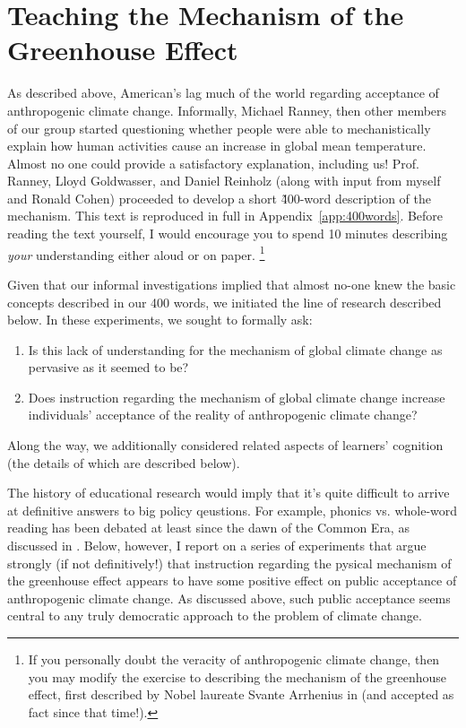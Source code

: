 \graphicspath{{mechanism/}}

\chapter{Teaching the Mechanism of the Greenhouse Effect}
\label{chap:mechanism}

As described above, American's lag much of the world regarding acceptance of
anthropogenic climate change. Informally, Michael Ranney, then other members of
our group started questioning whether people were able to mechanistically
explain how human activities cause an increase in global mean temperature.
Almost no one could provide a satisfactory explanation, including us! Prof.
Ranney, Lloyd Goldwasser, and Daniel Reinholz (along with input from myself and
Ronald Cohen) proceeded to develop a short \~400-word description of the
mechanism. This text is reproduced in full in Appendix~\ref{app:400words}.
Before reading the text yourself, I would encourage you to spend 10 minutes
describing \emph{your} understanding either aloud or on paper.
\footnote{If you personally doubt the veracity of anthropogenic climate change,
    then you may modify the exercise to describing the mechanism of the
    greenhouse effect, first described by Nobel laureate Svante Arrhenius in
    \citeyear{arrhenius} (and accepted as fact since that time!).}

Given that our informal investigations implied that almost no-one knew the basic
concepts described in our 400 words, we initiated the line of research described
below. In these experiments, we sought to formally ask:

\begin{enumerate}
\item Is this lack of understanding for the mechanism of global climate change
    as pervasive as it seemed to be?
\item Does instruction regarding the mechanism of global climate change increase
    individuals' acceptance of the reality of anthropogenic climate change?
\end{enumerate}
Along the way, we additionally considered related aspects of learners'
cognition (the details of which are described below).

The history of educational research would imply that it’s quite difficult to
arrive at definitive answers to big policy qeustions. For example, phonics vs.
whole-word reading has been debated at least since the dawn of the Common Era,
as discussed in \textcite{history-reading-instruction}. Below, however, I report
on a series of experiments that argue strongly (if not definitively!) that
instruction regarding the pysical mechanism of the greenhouse effect appears to
have some positive effect on public acceptance of anthropogenic climate change.
As discussed above, such public acceptance seems central to any truly democratic
approach to the problem of climate change.

